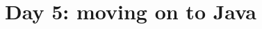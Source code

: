 \documentclass{article}
\begin{document}
\title{Day 5: moving on to Java}
\date{}
\maketitle



\end{document}
